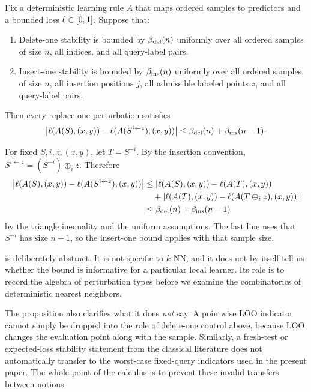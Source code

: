\begin{proposition}
\label{prop:4.1}
Fix a deterministic learning rule $A$ that maps ordered samples to predictors
and a bounded loss $\ell \in [0,1]$. Suppose that:
\begin{enumerate}[leftmargin=*,label=(\arabic*)]
    \item Delete-one stability is bounded by $\beta_{\mathrm{del}}(n)$ uniformly over all ordered samples of size $n$, all indices, and all query-label pairs.
    \item Insert-one stability is bounded by $\beta_{\mathrm{ins}}(n)$ uniformly over all ordered samples of size $n$, all insertion positions $j$, all admissible labeled points $z$, and all query-label pairs.
\end{enumerate}
Then every replace-one perturbation satisfies
\[
\left|\ell(A(S),(x,y))-\ell(A(S^{i\leftarrow z}),(x,y))\right|
\le \beta_{\mathrm{del}}(n)+\beta_{\mathrm{ins}}(n-1).
\]
\end{proposition}

\begin{note}
For fixed $S,i,z,(x,y)$, let $T=S^{-i}$. By the insertion convention,
$S^{i\leftarrow z}=(S^{-i})\oplus_i z$. Therefore
\begin{align*}
\left|\ell(A(S),(x,y))-\ell(A(S^{i\leftarrow z}),(x,y))\right|
&\le
\left|\ell(A(S),(x,y))-\ell(A(T),(x,y))\right| \\
&\quad +
\left|\ell(A(T),(x,y))-\ell(A(T\oplus_i z),(x,y))\right| \\
&\le \beta_{\mathrm{del}}(n) + \beta_{\mathrm{ins}}(n-1)
\end{align*}
by the triangle inequality and the uniform assumptions. The last line uses
that $S^{-i}$ has size $n-1$, so the insert-one bound applies with that sample
size.
\end{note}

 is deliberately abstract. It is not specific to
$k$-NN, and it does not by itself tell us whether the bound is informative for a
particular local learner. Its role is to record the algebra of perturbation
types before we examine the combinatorics of deterministic nearest
neighbors.

The proposition also clarifies what it does \emph{not} say. A pointwise LOO
indicator cannot simply be dropped into the role of delete-one control above,
because LOO changes the evaluation point along with the sample. Similarly, a
fresh-test or expected-loss stability statement from the classical literature
does not automatically transfer to the worst-case fixed-query indicators used
in the present paper. The whole point of the calculus is to prevent these
invalid transfers between notions.
